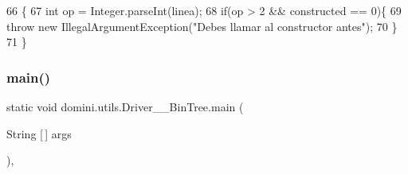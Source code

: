 \begin{DoxyCode}
66                                                                           \{
67         \textcolor{keywordtype}{int} op = Integer.parseInt(linea);
68         \textcolor{keywordflow}{if}(op > 2 && constructed == 0)\{
69             \textcolor{keywordflow}{throw} \textcolor{keyword}{new} IllegalArgumentException(\textcolor{stringliteral}{"Debes llamar al constructor antes"});
70         \}
71     \}
\end{DoxyCode}
\mbox{\label{classdomini_1_1utils_1_1Driver____BinTree_a08875cef02b7a770a105b0b6b976a681}} 
\subsubsection{\texorpdfstring{main()}{main()}}
{\footnotesize\ttfamily static void domini.\+utils.\+Driver\+\_\+\+\_\+\+Bin\+Tree.\+main (\begin{DoxyParamCaption}\item[{String \mbox{[}$\,$\mbox{]}}]{args }\end{DoxyParamCaption})\hspace{0.3cm}{\ttfamily [inline]}, {\ttfamily [static]}}


